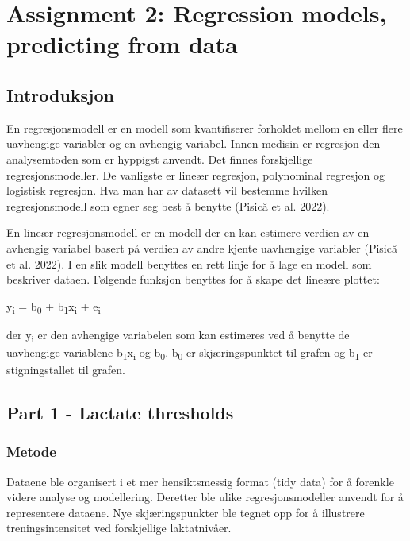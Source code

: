 \documentclass[
  letterpaper,
  DIV=11,
  numbers=noendperiod]{scrreprt}
\begin{document}

\chapter{Assignment 2: Regression models, predicting from
data}\label{assignment2}

\section{Introduksjon}\label{introduksjon-2}

En regresjonsmodell er en modell som kvantifiserer forholdet mellom en
eller flere uavhengige variabler og en avhengig variabel. Innen medisin
er regresjon den analysemtoden som er hyppigst anvendt. Det finnes
forskjellige regresjonsmodeller. De vanligste er lineær regresjon,
polynominal regresjon og logistisk regresjon. Hva man har av datasett
vil bestemme hvilken regresjonsmodell som egner seg best å benytte
(Pisică et al. 2022).

En lineær regresjonsmodell er en modell der en kan estimere verdien av
en avhengig variabel basert på verdien av andre kjente uavhengige
variabler (Pisică et al. 2022). I en slik modell benyttes en rett linje
for å lage en modell som beskriver dataen. Følgende funksjon benyttes
for å skape det lineære plottet:

y\textsubscript{i} = b\textsubscript{0} +
b\textsubscript{1}x\textsubscript{i} + e\textsubscript{i}

der y\textsubscript{i} er den avhengige variabelen som kan estimeres ved
å benytte de uavhengige variablene b\textsubscript{1}x\textsubscript{i}
og b\textsubscript{0}. b\textsubscript{0} er skjæringspunktet til grafen
og b\textsubscript{1} er stigningstallet til grafen.

\section{Part 1 - Lactate thresholds}\label{part-1---lactate-thresholds}

\subsection{Metode}\label{metode-1}

Dataene ble organisert i et mer hensiktsmessig format (tidy data) for å
forenkle videre analyse og modellering. Deretter ble ulike
regresjonsmodeller anvendt for å representere dataene. Nye
skjæringspunkter ble tegnet opp for å illustrere treningsintensitet ved
forskjellige laktatnivåer.
\end{document}
